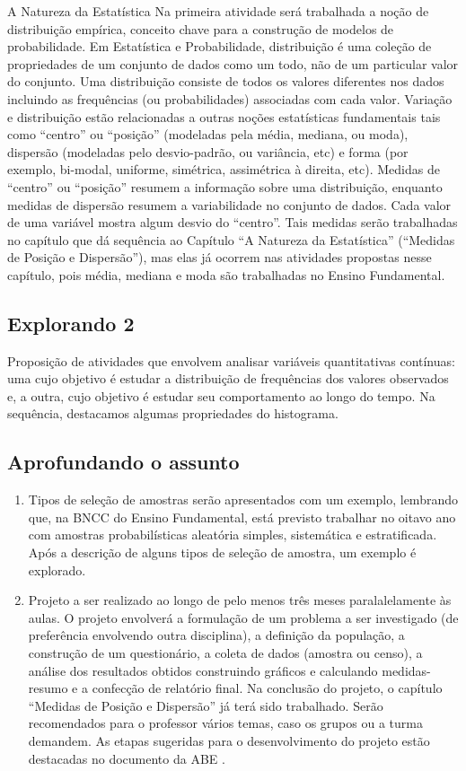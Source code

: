 \begin{apresentacao}{A Natureza da Estatística}
Na primeira atividade será trabalhada a noção de distribuição empírica, conceito chave para a construção de modelos de probabilidade. Em Estatística e Probabilidade, distribuição é uma coleção de propriedades de um conjunto de dados como um todo, não de um particular valor do conjunto. Uma distribuição consiste de todos os valores diferentes nos dados incluindo as frequências (ou probabilidades) associadas com cada valor. Variação e distribuição estão relacionadas a outras noções estatísticas fundamentais tais como “centro” ou “posição” (modeladas pela média, mediana, ou moda), dispersão (modeladas pelo desvio-padrão, ou variância, etc) e forma (por exemplo, bi-modal, uniforme, simétrica, assimétrica à direita, etc). Medidas de “centro” ou “posição” resumem a informação sobre uma distribuição, enquanto medidas de dispersão resumem a variabilidade no conjunto de dados. Cada valor de uma variável mostra algum desvio do “centro”. Tais medidas serão trabalhadas no capítulo que dá sequência ao Capítulo “A Natureza da Estatística” (“Medidas de Posição e Dispersão”), mas elas já ocorrem nas atividades propostas nesse capítulo, pois média, mediana e moda são trabalhadas no Ensino Fundamental.

\subsection{Explorando 2} Proposição de atividades que envolvem analisar variáveis quantitativas contínuas: uma cujo objetivo é estudar a distribuição de frequências dos valores observados e, a outra, cujo objetivo é estudar seu comportamento ao longo do tempo. Na sequência, destacamos algumas propriedades do histograma.

\subsection{Aprofundando o assunto}
\begin{enumerate}
\item {} 
Tipos de seleção de amostras serão apresentados com um exemplo, lembrando que, na BNCC do Ensino Fundamental, está previsto trabalhar no oitavo ano com amostras probabilísticas aleatória simples, sistemática e estratificada. Após a descrição de alguns tipos de seleção de amostra, um exemplo é explorado.

\item {} 
Projeto a ser realizado ao longo de pelo menos três meses paralalelamente às aulas. O projeto envolverá a formulação de um problema a ser investigado (de preferência envolvendo outra disciplina), a definição da população, a construção de um questionário, a coleta de dados (amostra ou censo), a análise dos resultados obtidos construindo gráficos e calculando medidas-resumo e a confecção de relatório final. Na conclusão do projeto, o capítulo “Medidas de Posição e Dispersão” já terá sido trabalhado. Serão recomendados para o professor vários temas, caso os grupos ou a turma demandem. As etapas sugeridas para o desenvolvimento do projeto estão destacadas no documento da ABE \citep{abe2015}.


\end{enumerate}
\end{apresentacao}
